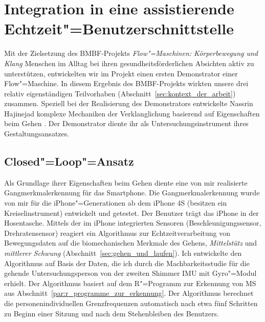 

\chapter{Integration in eine assistierende Echtzeit"=Benutzerschnittstelle} \label{cha:integration_in_eine_assistierende_echtzeit_benutzerschnittstelle}

Mit der Zielsetzung des \acs{BMBF}-Projekts \emph{Flow"=Maschinen: Körperbewegung und Klang} Menschen im Alltag bei ihren gesundheitsförderlichen Absichten aktiv zu unterstützen, entwickelten wir im Projekt einen ersten Demonstrator einer Flow"=Maschine. In diesem Ergebnis des \acs{BMBF}-Projekts wirkten unsere drei relativ eigenständigen Teilvorhaben (Abschnitt~\ref{sec:kontext_der_arbeit}) zusammen. Speziell bei der Realisierung des Demonstrators entwickelte Nassrin Hajinejad komplexe Mechaniken der Verklanglichung basierend auf Eigenschaften beim Gehen \citep{Hajinejad2013, Hajinejad2015}. Der Demonstrator diente ihr als Untersuchungsinstrument ihres Gestaltungsansatzes.

\section{Closed"=Loop"=Ansatz} 

\label{sec:closed_loop_ansatz}

Als Grundlage ihrer Eigenschaften beim Gehen diente eine von mir realisierte Gangmerkmalerkennung für das Smartphone. Die Gangmerkmalerkennung wurde von mir für die iPhone"=Generationen ab dem iPhone 4S (besitzen ein Kreiselinstrument) entwickelt und getestet. Der Benutzer trägt das iPhone in der Hosentasche. Mittels der im iPhone integrierten Sensoren (Beschleunigungssensor, Drehratensensor) reagiert ein Algorithmus zur Echtzeitverarbeitung von Bewegungsdaten auf die biomechanischen Merkmale des Gehens, \emph{Mittelstütz} und \emph{mittlerer Schwung} (Abschnitt~\ref{sec:gehen_und_laufen}). Ich entwickelte den Algorithmus auf Basis der Daten, die ich durch die Machbarkeitsstudie für die gehende Untersuchungsperson von der zweiten Shimmer \ac{IMU} mit Gyro"=Modul erhielt. Der Algorithmus basiert auf dem R"=Programm zur Erkennung von \ac{MS} aus Abschnitt~\ref{par:r_programme_zur_erkennung}. Der Algorithmus berechnet die personenindividuellen Grenzfrequenzen automatisch nach etwa fünf Schritten zu Beginn einer Sitzung und nach dem Stehenbleiben des Benutzers.

